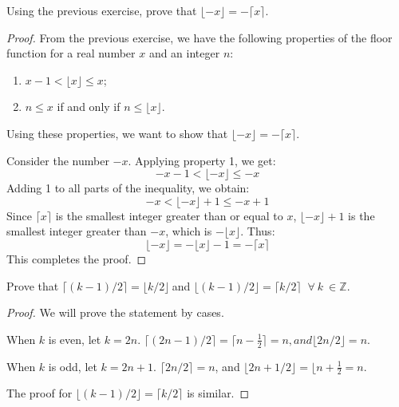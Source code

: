         \begin{exercise}
            Using the previous exercise, prove that \( \lfloor -x \rfloor = -\lceil x \rceil \).
            \end{exercise}
            
            \begin{proof}
                From the previous exercise, we have the following properties of the floor function for a real number \( x \) and an integer \( n \):
                \begin{enumerate}
                    \item \( x - 1 < \lfloor x \rfloor \leq x \);
                    \item \( n \leq x \) if and only if \( n \leq \lfloor x \rfloor \).
                \end{enumerate}
                Using these properties, we want to show that \( \lfloor -x \rfloor = -\lceil x \rceil \).
                
                Consider the number \( -x \). Applying property 1, we get:
                \[ -x - 1 < \lfloor -x \rfloor \leq -x \]
                Adding 1 to all parts of the inequality, we obtain:
                \[ -x < \lfloor -x \rfloor + 1 \leq -x + 1 \]
                Since \( \lceil x \rceil \) is the smallest integer greater than or equal to \( x \), \( \lfloor -x \rfloor + 1 \) is the smallest integer greater than \( -x \), which is \( -\lfloor x \rfloor \). Thus:
                \[ \lfloor -x \rfloor = -\lfloor x \rfloor - 1 = -\lceil x \rceil \]
                This completes the proof.
            \end{proof}

    \begin{exercise}
        Prove that $\displaystyle \lceil ( k-1) /2\rceil =\lfloor k/2\rfloor \ $and $\displaystyle \lfloor ( k-1) /2\rfloor =\lceil k/2\rceil \ $ $\displaystyle \forall \ k\ \in \mathbb{Z} .$
    \end{exercise}
    \begin{proof}
        We will prove the statement by cases.

        When $k$ is even, let $k=2n$. $\lceil (2n-1)/2\rceil = \lceil n - \frac{1}{2}\rceil=n, and \lfloor 2n/2\rfloor = n$.

        When $k$ is odd, let $k=2n+1$. $\lceil 2n/2 \rceil = n$, and $\lfloor2n+1/2\rfloor=\lfloor n+\frac{1}{2}=n$.
        
        The proof for $\displaystyle \lfloor ( k-1) /2\rfloor =\lceil k/2\rceil$ is similar.
    \end{proof}






